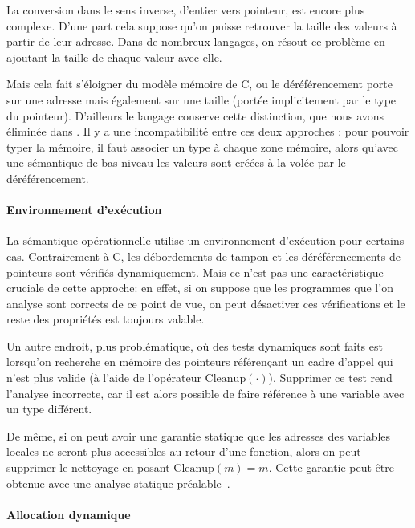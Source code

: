 La conversion dans le sens inverse, d'entier vers pointeur, est
encore plus complexe. D'une part cela suppose qu'on puisse retrouver la taille
des valeurs à partir de leur adresse. Dans de nombreux langages, on résout ce
problème en ajoutant la taille de chaque valeur avec elle.

Mais cela fait s'éloigner du modèle mémoire de C, ou le déréférencement porte
sur une adresse mais également sur une taille (portée implicitement par le type
du pointeur). D'ailleurs le langage \newspeak{} conserve cette distinction, que
nous avons éliminée dans \langname. Il y a une incompatibilité entre ces deux
approches : pour pouvoir typer la mémoire, il faut associer un type à chaque
zone mémoire, alors qu'avec une sémantique de bas niveau les valeurs sont créées
à la volée par le déréférencement.



\paragraph{Environnement d'exécution}

La sémantique opérationnelle utilise un environnement d'exécution pour certains
cas. Contrairement à C, les débordements de tampon et les déréférencements de
pointeurs sont vérifiés dynamiquement. Mais ce n'est pas une caractéristique
cruciale de cette approche: en effet, si on suppose que les programmes que l'on
analyse sont corrects de ce point de vue, on peut désactiver ces vérifications
et le reste des propriétés est toujours valable.

Un autre endroit, plus problématique, où des tests dynamiques sont faits est
lorsqu'on recherche en mémoire des pointeurs référençant un cadre d'appel qui
n'est plus valide (à l'aide de l'opérateur $\mathrm{Cleanup}(\cdot)$). Supprimer
ce test rend l'analyse incorrecte, car il est alors possible de faire référence
à une variable avec un type différent.

De même, si on peut avoir une garantie statique que les adresses des variables
locales ne seront plus accessibles au retour d'une fonction, alors on peut
supprimer le nettoyage en posant $\mathrm{Cleanup}(m) = m$. Cette garantie peut
être obtenue avec une analyse statique préalable~\cite{ifm10}.

\paragraph{Allocation dynamique}

